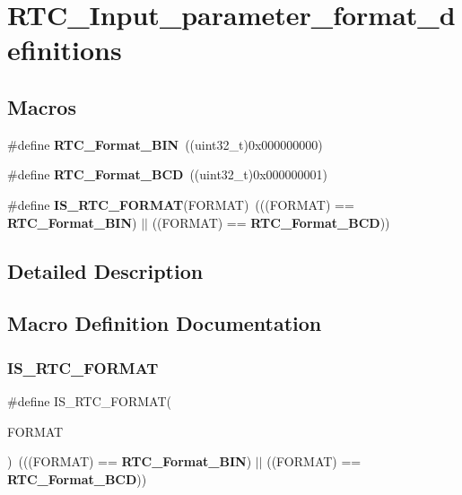 \section{R\+T\+C\+\_\+\+Input\+\_\+parameter\+\_\+format\+\_\+definitions}
\label{group__RTC__Input__parameter__format__definitions}
\subsection*{Macros}
\begin{DoxyCompactItemize}
\item 
\#define \textbf{ R\+T\+C\+\_\+\+Format\+\_\+\+B\+IN}~((uint32\+\_\+t)0x000000000)
\item 
\#define \textbf{ R\+T\+C\+\_\+\+Format\+\_\+\+B\+CD}~((uint32\+\_\+t)0x000000001)
\item 
\#define \textbf{ I\+S\+\_\+\+R\+T\+C\+\_\+\+F\+O\+R\+M\+AT}(F\+O\+R\+M\+AT)~(((F\+O\+R\+M\+AT) == \textbf{ R\+T\+C\+\_\+\+Format\+\_\+\+B\+IN}) $\vert$$\vert$ ((F\+O\+R\+M\+AT) == \textbf{ R\+T\+C\+\_\+\+Format\+\_\+\+B\+CD}))
\end{DoxyCompactItemize}


\subsection{Detailed Description}


\subsection{Macro Definition Documentation}
\mbox{\label{group__RTC__Input__parameter__format__definitions_ga05a1ca8558058d71322ccf1045b8fb1c}} 
\subsubsection{I\+S\+\_\+\+R\+T\+C\+\_\+\+F\+O\+R\+M\+AT}
{\footnotesize\ttfamily \#define I\+S\+\_\+\+R\+T\+C\+\_\+\+F\+O\+R\+M\+AT(\begin{DoxyParamCaption}\item[{}]{F\+O\+R\+M\+AT }\end{DoxyParamCaption})~(((F\+O\+R\+M\+AT) == \textbf{ R\+T\+C\+\_\+\+Format\+\_\+\+B\+IN}) $\vert$$\vert$ ((F\+O\+R\+M\+AT) == \textbf{ R\+T\+C\+\_\+\+Format\+\_\+\+B\+CD}))}



